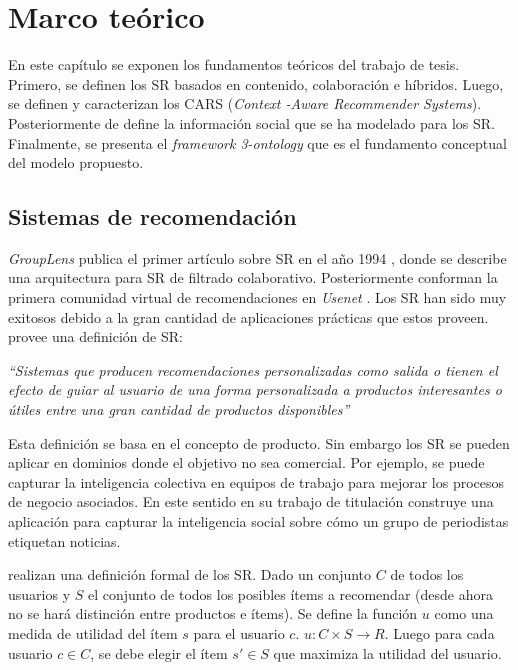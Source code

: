 \chapter{Marco te\'orico}
\label{cap:marco}

En este capítulo se exponen los fundamentos teóricos del trabajo de tesis. Primero, se definen los SR basados en contenido, colaboración e híbridos. Luego, se definen y caracterizan los CARS (\textit{Context -Aware Recommender Systems}). Posteriormente de define la información social que se ha modelado para los SR. Finalmente, se presenta el \textit{framework 3-ontology} que es el fundamento conceptual del modelo propuesto.


\section{Sistemas de recomendaci\'on}
\label{marco:sr}

\textit{GroupLens} publica el primer artículo sobre SR en el año 1994 \citep{Resnick:1994}, donde se describe una arquitectura para SR de filtrado colaborativo. Posteriormente conforman la primera comunidad virtual de recomendaciones en \textit{Usenet} \citep{Konstan:1997}. Los SR han sido muy exitosos debido a la gran cantidad de aplicaciones prácticas que estos proveen. \cite{Burke:2002} provee una definición de SR:

\begin{center}
	\textit{“Sistemas que producen recomendaciones personalizadas como salida o tienen el efecto de guiar al usuario de una forma personalizada a productos interesantes o útiles entre una gran cantidad de productos disponibles”}
\end{center}

Esta definición se basa en el concepto de producto. Sin embargo los SR se pueden aplicar en dominios donde el objetivo no sea comercial. Por ejemplo, se puede capturar la inteligencia colectiva en equipos de trabajo para mejorar los procesos de negocio asociados. En este sentido \cite{Alonso:2012} en su trabajo de titulación construye una aplicación para capturar la inteligencia social sobre cómo un grupo de periodistas etiquetan noticias.

\cite{Adomavicius:2005} realizan una definición formal de los SR. Dado un conjunto $C$ de todos los usuarios y $S$ el conjunto de todos los posibles ítems a recomendar (desde ahora no se hará distinción entre productos e ítems). Se define la función $u$ como una medida de utilidad del ítem $s$ para el usuario $c$. $u: C \times S \rightarrow R$. Luego para cada usuario $c \in C$, se debe elegir el ítem $s' \in S$ que maximiza la utilidad del usuario. 

